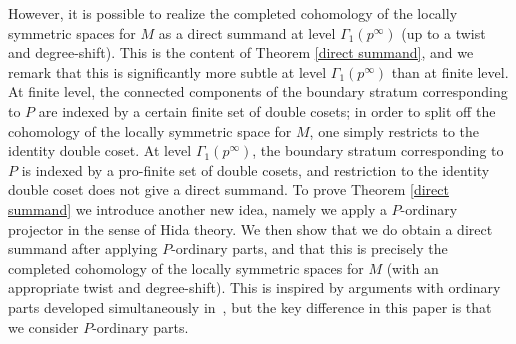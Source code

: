 \documentclass{amsart}
\theoremstyle{remark}
\numberwithin{equation}{subsection}
\renewcommand{\(}{\left(}
\renewcommand{\)}{\right)}
\begin{document}
However, it is possible to realize the completed cohomology of the locally symmetric spaces for $M$ as a direct summand at level $\Gamma_{1}(p^{\infty})$ (up to a twist and degree-shift). This is the content of Theorem \ref{direct summand}, and we remark that this is significantly more subtle at level $\Gamma_1(p^\infty)$ than at finite level. At finite level, the connected components of the boundary stratum corresponding to $P$ are indexed by a certain finite set of double cosets; in order to split off the cohomology of the locally symmetric space for $M$, one simply restricts to the identity double coset. At level $\Gamma_1(p^\infty)$, the boundary stratum corresponding to $P$ is indexed by a pro-finite set of double cosets, and restriction to the identity double coset does not give a direct summand. To prove Theorem \ref{direct summand} we introduce another new idea, namely we apply a $P$-ordinary projector in the sense of Hida theory. We then show that we do obtain a direct summand after applying $P$-ordinary parts, and that this is precisely the completed cohomology of the locally symmetric spaces for $M$ (with an appropriate twist and degree-shift). This is inspired by arguments with ordinary parts developed simultaneously in~\cite[\S 5]{accghlnstt}, but the key difference in this paper is that we consider $P$-ordinary parts.   
\end{document}

